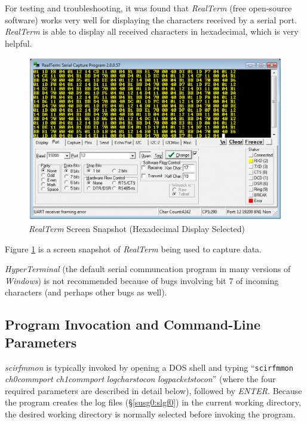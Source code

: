 \documentclass[letterpaper,10pt,titlepage]{article}
\newcommand{\productname}{scirfmmon}
\newcommand{\productnameemph}{\emph{\productname}}
\begin{document}
For testing and troubleshooting, it was found that
\emph{RealTerm} \cite{bibref:swp:realterm}
(free open-source software) works very well for displaying the
characters received by a serial port.  
\emph{RealTerm} is able to display all
received characters in hexadecimal, which is very helpful.

\begin{figure}
\centering
\includegraphics[width=4.6in]{rtermsnapshot01.eps}
\caption{\emph{RealTerm} Screen Snapshot (Hexadecimal Display Selected)}
\label{fig:susg0:stts0:01}
\end{figure}

Figure \ref{fig:susg0:stts0:01} is a screen snapshot of
\emph{RealTerm} being used
to capture data.

\emph{HyperTerminal} (the default
serial communcation program in many versions of \emph{Windows})
is not recommended because of bugs involving bit 7 of incoming characters
(and perhaps other bugs as well).


\subsection{Program Invocation and Command-Line Parameters}
\label{susg0:spin0}

\productnameemph{} is typically invoked by opening a DOS shell and 
typing ``\texttt{\productname{}} \emph{ch0commport}
\emph{ch1commport} \emph{logcharstocon} \emph{logpacketstocon}'' (where
the four required parameters are described in detail below), 
followed by \emph{ENTER}.  Because the program creates the log files 
(\S{}\ref{susg0:slgf0}) in the current working directory, the desired
working directory is normally selected before invoking the program.
\end{document}
